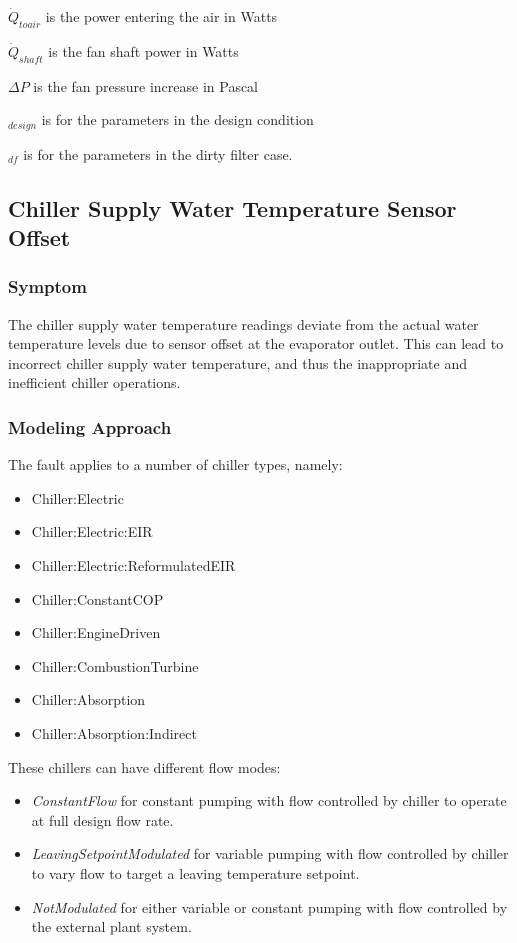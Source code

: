 \(\dot{Q}_{toair}\) is the power entering the air in Watts

\(\dot{Q}_{shaft}\) is the fan shaft power in Watts

\(\Delta P\) is the fan pressure increase in Pascal

\(_{design}\) is for the parameters in the design condition

\(_{df}\) is for the parameters in the dirty filter case.


\subsection{Chiller Supply Water Temperature Sensor Offset}\label{chiller-supply-water-temperature-sensor-offset}

\subsubsection{Symptom}

The chiller supply water temperature readings deviate from the actual water temperature levels due to sensor offset at the evaporator outlet. This can lead to incorrect chiller supply water temperature, and thus the inappropriate and inefficient chiller operations.

\subsubsection{Modeling Approach}

The fault applies to a number of chiller types, namely:

\begin{itemize}
\tightlist
\item
  Chiller:Electric
\item
  Chiller:Electric:EIR
\item
  Chiller:Electric:ReformulatedEIR
\item
  Chiller:ConstantCOP
\item
  Chiller:EngineDriven
\item
  Chiller:CombustionTurbine
\item
  Chiller:Absorption
\item
  Chiller:Absorption:Indirect
\end{itemize}

These chillers can have different flow modes:

\begin{itemize}
\tightlist
\item
  \emph{ConstantFlow} for constant pumping with flow controlled by chiller to operate at full design flow rate.
\item
  \emph{LeavingSetpointModulated} for variable pumping with flow controlled by chiller to vary flow to target a leaving temperature setpoint.
\item
  \emph{NotModulated} for either variable or constant pumping with flow controlled by the external plant system.
\end{itemize}

